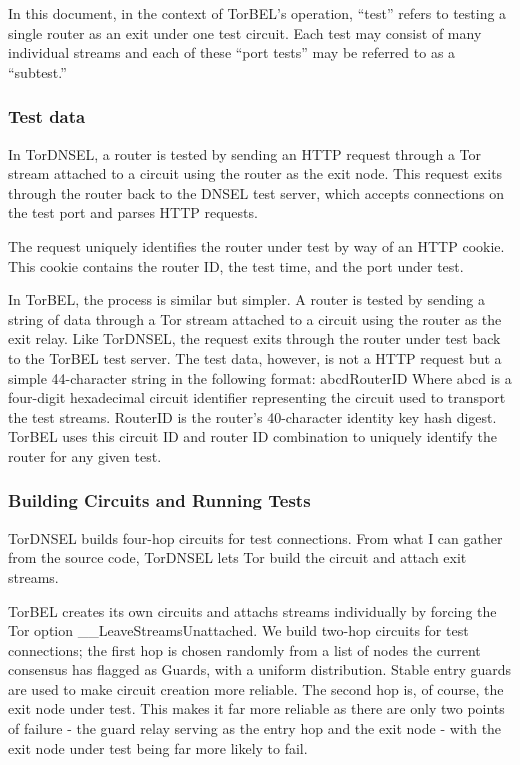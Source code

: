 \documentclass{article}
\begin{document}
In this document, in the context of TorBEL's operation, ``test''
refers to testing a single router as an exit under one test circuit.
Each test may consist of many individual streams and each of these
``port tests'' may be referred to as a ``subtest.''

\subsubsection{Test data}
In TorDNSEL, a router is tested by sending an HTTP request through a
Tor stream attached to a circuit using the router as the exit node.
This request exits through the router back to the DNSEL test server,
which accepts connections on the test port and parses HTTP requests.

The request uniquely identifies the router under test by way of an HTTP cookie.
This cookie contains the router ID, the test time, and the port under test.

In TorBEL, the process is similar but simpler.  A router is tested by
sending a string of data through a Tor stream attached to a circuit
using the router as the exit relay.  Like TorDNSEL, the request exits
through the router under test back to the TorBEL test server.  The
test data, however, is not a HTTP request but a simple 44-character
string in the following format: {abcd}{RouterID} Where {abcd} is a
four-digit hexadecimal circuit identifier representing the circuit
used to transport the test streams.  {RouterID} is the router's
40-character identity key hash digest.  TorBEL uses this circuit ID
and router ID combination to uniquely identify the router for any
given test.

\subsubsection{Building Circuits and Running Tests}
TorDNSEL builds four-hop circuits for test connections.  From what I
can gather from the source code, TorDNSEL lets Tor build the circuit
and attach exit streams.

TorBEL creates its own circuits and attachs streams individually by
forcing the Tor option \_\_LeaveStreamsUnattached. We build two-hop
circuits for test connections; the first hop is chosen randomly from a
list of nodes the current consensus has flagged as Guards, with a
uniform distribution.  Stable entry guards are used to make circuit
creation more reliable.  The second hop is, of course, the exit node
under test.  This makes it far more reliable as there are only two
points of failure - the guard relay serving as the entry hop and the
exit node - with the exit node under test being far more likely to
fail.
\end{document}
